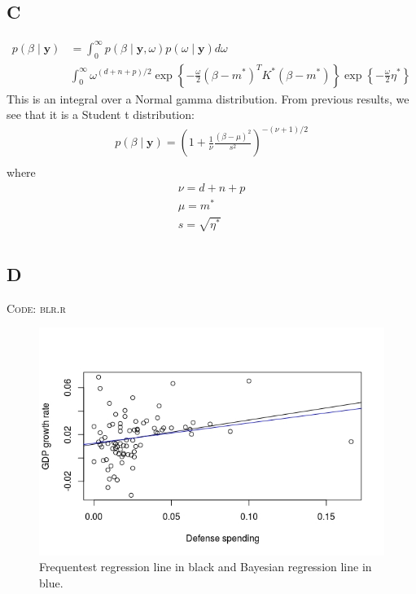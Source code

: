 \documentclass{article}
\begin{document}
\subsection*{C}
\begin{align*}
p(\beta \mid \mathbf{y}) &= \int_{0}^{\infty} p(\beta \mid \mathbf{y}, \omega) p(\omega \mid \mathbf{y}) d\omega\\
& \int_{0}^{\infty} \omega^{(d+n+p)/2} \exp \left\lbrace -\frac{\omega}{2}(\beta - m^*)^T K^* (\beta - m^*) \right\rbrace \exp \left\lbrace -\frac{\omega}{2} \eta^* \right\rbrace
\end{align*}
This is an integral over a Normal gamma distribution. From previous results, we see that it is a Student t distribution:
\begin{align*}
p(\beta \mid \mathbf{y}) = \left(1 + \frac{1}{\nu}\frac{(\beta-\mu)^2}{s^2}\right)^{-(\nu+1)/2}\\
\end{align*}
where 
\begin{align*}
\nu = d + n + p\\
\mu = m^*\\
s = \sqrt{\eta^*}\\
\end{align*}

\subsection*{D}
\textsc{Code: blr.r}


\begin{figure}[h!]
\includegraphics[width=\linewidth]{blm.jpeg}
\caption{Frequentest regression line in black and Bayesian regression line in blue.}
\label{fig:blm}
\end{figure}
\end{document}
